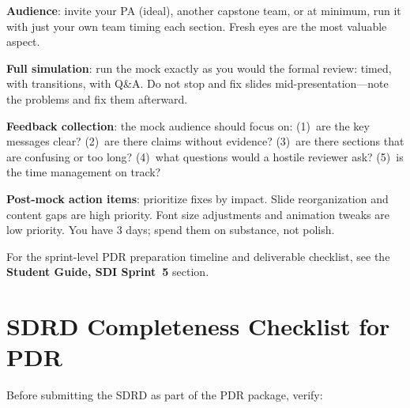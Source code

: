 \textbf{Audience}: invite your PA (ideal), another capstone team, or at minimum, run it with just your own team timing each section. Fresh eyes are the most valuable aspect.

\textbf{Full simulation}: run the mock exactly as you would the formal review: timed, with transitions, with Q\&A. Do not stop and fix slides mid-presentation---note the problems and fix them afterward.

\textbf{Feedback collection}: the mock audience should focus on: (1)~are the key messages clear? (2)~are there claims without evidence? (3)~are there sections that are confusing or too long? (4)~what questions would a hostile reviewer ask? (5)~is the time management on track?

\textbf{Post-mock action items}: prioritize fixes by impact. Slide reorganization and content gaps are high priority. Font size adjustments and animation tweaks are low priority. You have 3 days; spend them on substance, not polish.



\begin{tipbox}
For the sprint-level PDR preparation timeline and deliverable checklist, see the \textbf{Student Guide, SDI Sprint~5} section.
\end{tipbox}

\section{SDRD Completeness Checklist for PDR}
Before submitting the SDRD as part of the PDR package, verify:

